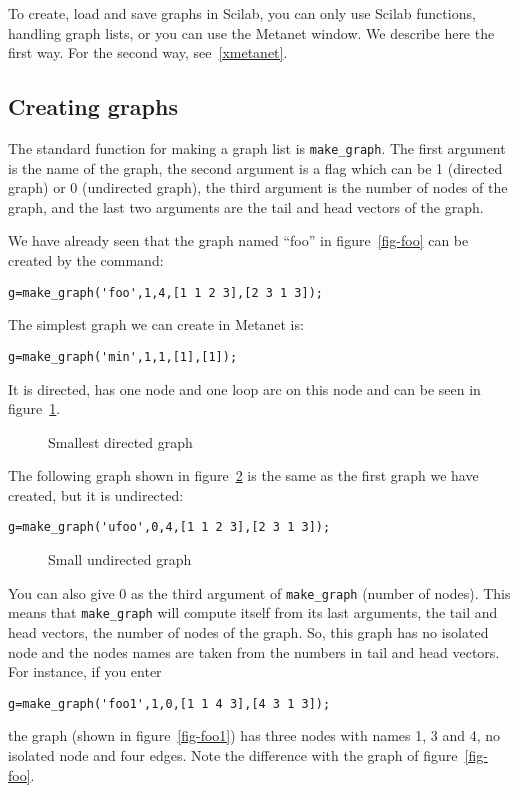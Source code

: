 \documentclass[11pt]{article}
\newcommand{\func}[1]{\texttt{#1}}
\begin{document}
To create, load and save graphs in Scilab, you can only use Scilab
functions, handling graph lists, or you can use the Metanet window.
We describe here the first way. For the second way, see~\ref{xmetanet}.

\subsection{Creating graphs}\label{creating}

The standard function for making a graph list is
\func{make\_graph}.
The first argument is the name of the graph,
the second argument is a flag which can be 1 (directed graph) or 0
(undirected graph), the third argument is the number of nodes of the graph,
and the last two arguments are the tail
and head
vectors of 
the graph.

We have already seen that the graph named ``foo'' in figure~\ref{fig-foo}
can be created by the command:
\begin{verbatim}
g=make_graph('foo',1,4,[1 1 2 3],[2 3 1 3]);
\end{verbatim}

The simplest graph we can create in Metanet is:
\begin{verbatim}
g=make_graph('min',1,1,[1],[1]);
\end{verbatim}

It is directed, has one node and one loop arc on this node and can be
seen in figure~\ref{fig-min}.
\begin{figure}
  \centerline{}
  \caption{Smallest directed graph}
  \label{fig-min}
\end{figure}

The following graph shown in figure~\ref{fig-ufoo} is the same as
the first graph we have created, but it 
is undirected:
\begin{verbatim}
g=make_graph('ufoo',0,4,[1 1 2 3],[2 3 1 3]);
\end{verbatim}

\begin{figure}
  \centerline{}
  \caption{Small undirected graph}
  \label{fig-ufoo}
\end{figure}

You can also give 0 as the third argument of \func{make\_graph}
(number of nodes). This
means that \func{make\_graph} will compute itself from its last
arguments, the tail and head vectors, the number of nodes of the graph.
So, this graph has no isolated node and the nodes names are
taken from the numbers in tail and head vectors.
For instance, if you enter
\begin{verbatim}
g=make_graph('foo1',1,0,[1 1 4 3],[4 3 1 3]);
\end{verbatim}
the graph (shown in figure~\ref{fig-foo1}) has three nodes with names
1, 3 and 4, no isolated node and four edges. Note the difference with
the graph of figure~\ref{fig-foo}.
\end{document}
